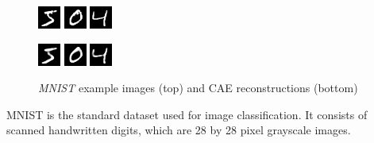 \documentclass[draft]{article}
\begin{document}
        \begin{figure}[h]
          \centering
          \includegraphics[width=0.15\linewidth]{../graphics/reconstructions/mnist/input_00.png}
          \includegraphics[width=0.15\linewidth]{../graphics/reconstructions/mnist/input_01.png}
          \includegraphics[width=0.15\linewidth]{../graphics/reconstructions/mnist/input_02.png}

          \includegraphics[width=0.15\linewidth]{../graphics/reconstructions/mnist/reconstruction_00.png}
          \includegraphics[width=0.15\linewidth]{../graphics/reconstructions/mnist/reconstruction_01.png}
          \includegraphics[width=0.15\linewidth]{../graphics/reconstructions/mnist/reconstruction_02.png}

          \caption{\emph{MNIST} example images (top) and CAE reconstructions (bottom)}
        \end{figure}
        MNIST \citep{lecun1998mnist} is the standard dataset used for image classification. It consists of scanned handwritten digits, which are 28 by 28 pixel grayscale images.
\end{document}
